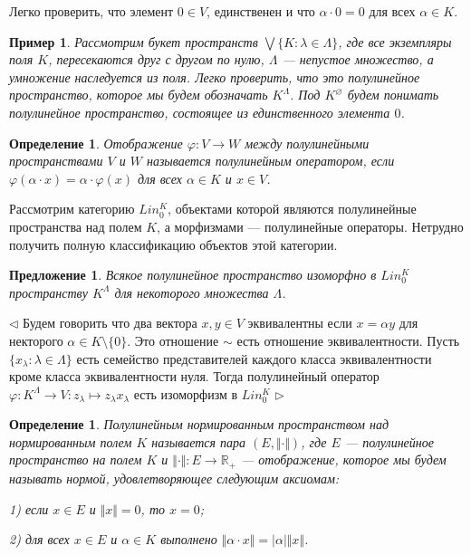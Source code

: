 \documentclass[12pt]{article}
\newtheorem{proposition}[theorem]{Предложение}
\newtheorem{definition}[theorem]{Определение}
\newtheorem{example}[theorem]{Пример}
\newenvironment{proof}{\par $\triangleleft$}{$\triangleright$}
\begin{document}
Легко проверить, что элемент $0\in V$, единственен и что $\alpha \cdot 0 = 0$ для всех $\alpha\in K$.

\begin{example}\label{ExSemiLinModelSp}
Рассмотрим букет пространств $\bigvee\{K: \lambda \in\Lambda\}$, где все экземпляры поля $K$, пересекаются друг с другом по нулю, $\Lambda$ --- непустое множество, а умножение наследуется из поля. Легко проверить, что это полулинейное пространство, которое мы будем обозначать $K^{\Lambda}$. Под $K^{\varnothing}$ будем понимать полулинейное пространство, состоящее из единственного элемента $0$. 
\end{example}

\begin{definition}\label{DefSemiLinOp} Отображение $\varphi : V \to W$ между полулинейными пространствами $V$ и $W$ называется полулинейным оператором, если $\varphi(\alpha \cdot x) = \alpha \cdot \varphi(x)$ для всех $\alpha \in K$ и $x \in V$.
\end{definition}

Рассмотрим категорию $Lin_{0}^{K}$, объектами которой являются полулинейные пространства над полем $K$, а морфизмами --- полулинейные операторы. Нетрудно получить полную классификацию объектов этой категории.

\begin{proposition}\label{PrSemiLinSpDesc}
Всякое полулинейное пространство изоморфно в $Lin_{0}^{K}$ пространству $K^{\Lambda}$ для некоторого множества $\Lambda$.
\end{proposition}
\begin{proof} Будем говорить что два вектора $x,y\in V$ эквивалентны если $x=\alpha y$ для некторого $\alpha\in K\setminus\{0\}$. Это отношение $\sim$ есть отношение эквивалентности. Пусть $\{x_\lambda:\lambda\in \Lambda\}$ есть семейство представителей каждого класса эквивалентности кроме класса эквивалентности нуля. Тогда полулинейный оператор $\varphi: K^\Lambda\to V: z_\lambda\mapsto z_\lambda x_\lambda$ есть изоморфизм в $Lin_0^K$
\end{proof}

\begin{definition}\label{DefSemiLinNorSp} Полулинейным нормированным пространством над нормированным полем $K$ называется пара $(E, \Vert \cdot \Vert)$, где $E$ --- полулинейное пространство на полем $K$ и $ \Vert \cdot \Vert : E \to \mathbb{R}_+$ --- отображение, которое мы будем называть нормой, удовлетворяющее следующим аксиомам:

1) если $x\in E$ и $\Vert x \Vert = 0$, то $x = 0$;

2) для всех $x\in E$ и $\alpha\in K$ выполнено $\Vert \alpha \cdot x \Vert = | \alpha| \Vert x \Vert$.
\end{definition}
\end{document}
